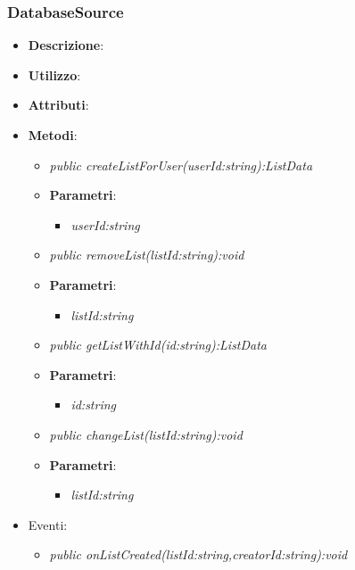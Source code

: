 \subsubsection{DatabaseSource}
\begin{itemize}
\item \textbf{Descrizione}: 
\item \textbf{Utilizzo}:
\item \textbf{Attributi}: 
\item \textbf{Metodi}:
	\begin{itemize}
	\item \textit{public createListForUser(userId:string):ListData}\\

			\item{\textbf{Parametri}: \begin{itemize}
			\item \textit{userId:string}\\

			\end{itemize}}
	\item \textit{public removeList(listId:string):void}\\

			\item{\textbf{Parametri}: \begin{itemize}
			\item \textit{listId:string}\\

			\end{itemize}}
	\item \textit{public getListWithId(id:string):ListData}\\

			\item{\textbf{Parametri}: \begin{itemize}
			\item \textit{id:string}\\

			\end{itemize}}
	\item \textit{public changeList(listId:string):void}\\

			\item{\textbf{Parametri}: \begin{itemize}
			\item \textit{listId:string}\\

			\end{itemize}}
	\end{itemize}
\item{Eventi}:
	\begin{itemize}
	\item \textit{public onListCreated(listId:string,creatorId:string):void}\\


\end{itemize}
\end{itemize}

